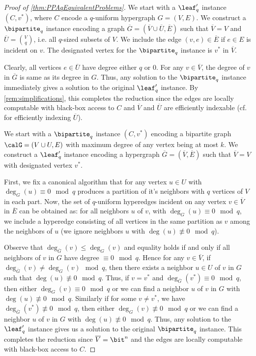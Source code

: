 \begin{proof}[Proof of \autoref{thm:PPAqEquivalentProblems}]
\medskip

We start with a $\leaf'_q$ instance $(C, v^*)$, where $C$ encode a $q$-uniform hypergraph $G = (V, E)$. We construct a $\bipartite_q$ instance encoding a graph $\overline{G} = (\overline{V} \cup \overline{U}, \overline{E})$ such that $\overline{V} = V$ and $\overline{U} = \binom{V}{q}$, i.e. all $q$-sized subsets of $V$. We include the edge $(v,e) \in \overline{E}$ if $e \in E$ is incident on $v$. The designated vertex for the $\bipartite_q$ instance is $v^*$ in $\overline{V}$.

Clearly, all vertices $e \in \overline{U}$ have degree either $q$ or $0$. For any $v \in \overline{V}$, the degree of $v$ in $\overline{G}$ is same as its degree in $G$. Thus, any solution to the $\bipartite_q$ instance immediately gives a solution to the original $\leaf'_q$ instance. By \autoref{rem:simplifications}, this completes the reduction since the edges are locally computable with black-box access to $C$ and $\overline{V}$ and $\overline{U}$ are efficiently indexable (cf. \cite[\S2.3]{r31} for efficiently indexing $\overline{U}$).

\medskip

 We start with a $\bipartite_q$ instance $(C, v^*)$ encoding a bipartite graph $\calG = (V \cup U,E)$ with maximum degree of any vertex being at most $k$. We construct a $\leaf'_q$ instance encoding a hypergraph $\overline{G} = (\overline{V}, \overline{E})$ such that $\overline{V} = V$ with designated vertex $v^*$.

First, we fix a canonical algorithm that for any vertex $u \in U$ with $\deg_{G}(u) \equiv 0 \mod{q}$ produces a partition of it's neighbors with $q$ vertices of $V$ in each part. Now, the set of $q$-uniform hyperedges incident on any vertex $v \in \overline{V}$ in $\overline{E}$ can be obtained as: for all neighbors $u$ of $v$, with $\deg_G(u) \equiv 0 \mod{q}$, we include a hyperedge consisting of all vertices in the same partition as $v$ among the neighbors of $u$ (we ignore neighbors $u$ with $\deg(u) \not\equiv 0 \mod{q}$).

Observe that $\deg_{\overline{G}}(v) \le \deg_{G}(v)$ and equality holds if and only if all neighbors of $v$ in $G$ have degree $\equiv 0 \mod{q}$. Hence for any $v \in \overline{V}$, if $\deg_{\overline{G}}(v) \ne \deg_G(v) \mod{q}$, then there exists a neighbor $u \in U$ of $v$ in $G$ such that $\deg(u) \not\equiv 0 \mod{q}$. Thus, if $v = v^*$ and $\deg_{\overline{G}}(v^*) \equiv 0 \mod{q}$, then either $\deg_G(v) \equiv 0 \mod{q}$ or we can find a neighbor $u$ of $v$ in $G$ with $\deg(u) \not\equiv 0 \mod{q}$. Similarly if for some $v \ne v^*$, we have $\deg_{\overline{G}}(v^*) \not\equiv 0 \mod{q}$, then either $\deg_G(v) \not\equiv 0 \mod{q}$ or we can find a neighbor $u$ of $v$ in $G$ with $\deg(u) \not\equiv 0 \mod{q}$. Thus, any solution to the $\leaf'_q$ instance gives us a solution to the original $\bipartite_q$ instance. This completes the reduction since $\overline{V} = \bit^n$ and the edges are locally computable with black-box access to $C$.


\end{proof}
